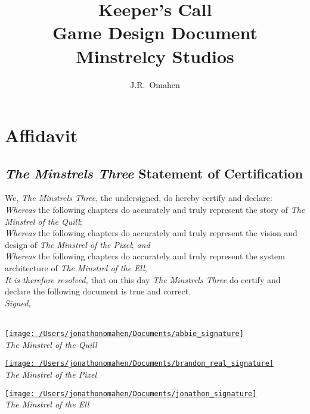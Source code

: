 \documentclass[letterpaper, twoside, 12pt]{memoir}
\title{{\HUGE Keeper's Call}\\
{\small Game Design Document}
\vspace{\fill} \\ 
Minstrelcy Studios
\vspace{\fill} \\ 
}
\author{J.R.~Omahen}
\begin{document}
\maketitle
\newpage

\tableofcontents

\frontmatter
\chapter{Affidavit}
\section*{\textit{The Minstrels Three} Statement of Certification}

{\large We,} \textit{The Minstrels Three}, the undersigned, do hereby certify and declare:
\\

{\large \textit{Whereas}} the following chapters do accurately and truly represent the story of \textit{The Minstrel of the Quill};
\\

{\large \textit{Whereas}} the following chapters do accurately and truly represent the vision and design of \textit{The Minstrel of the Pixel}; \textit{and}
\\

{\large \textit{Whereas}} the following chapters do accurately and truly represent the system architecture of \textit{The Minstrel of the Ell},
\\

{\large \textit{It is therefore resolved,}} that on this day \textit{The Minstrels Three} do certify and declare the following document is true and correct.
\\

\textit{Signed,}\\
\\

\begin{center}
\vspace{\fill}
  \parbox[c]{0.3\textwidth}{
    \underline{\texttt{[image: /Users/jonathonomahen/Documents/abbie\_signature]}}\\
 \textit{The Minstrel of the Quill} }
\hspace{\fill}
  \parbox[c]{0.3\textwidth}{
    \underline{\texttt{[image: /Users/jonathonomahen/Documents/brandon\_real\_signature]}}\\
 \textit{The Minstrel of the Pixel} }
\hspace{\fill}
  \parbox[c]{0.3\textwidth}{    \underline{\texttt{[image: /Users/jonathonomahen/Documents/jonathon\_signature]}}\\
    \textit{The Minstrel of the Ell}}
\end{center}
\end{document}

